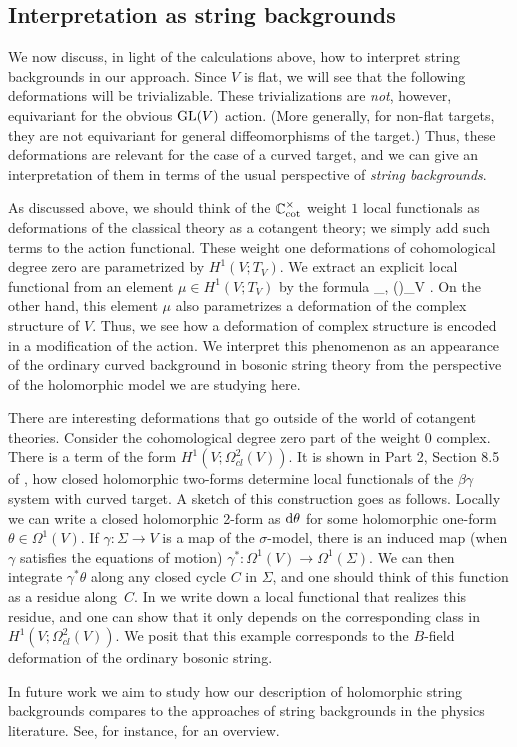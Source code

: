 \subsection{Interpretation as string backgrounds}

We now discuss, in light of the calculations above, how to interpret string backgrounds in our approach. 
Since $V$ is flat,
we will see that the following deformations will be trivializable. 
These trivializations are {\em not}, however, equivariant for the obvious ${\rm GL}(V)$ action.
(More generally, for non-flat targets, they are not equivariant for general diffeomorphisms of the target.) 
Thus, these deformations are relevant for the case of a curved target, and we can give an interpretation of them in terms of the usual perspective of {\em string backgrounds}. 

As discussed above, we should think of the $\mathbb C^\times_{\rm cot}$ weight $1$ local functionals as deformations of the classical theory as a cotangent theory;
we simply add such terms to the action functional.
These weight one deformations of cohomological degree zero are parametrized by $H^1(V ; T_V)$. 
We extract an explicit local functional from an element $\mu \in H^1(V ; T_V)$
by the formula
\ben
\int_\Sigma \<\beta, \mu(\gamma)\>_V .
\een 
On the other hand, this element $\mu$ also parametrizes a deformation of the complex structure of $V$.
Thus, we see how a deformation of complex structure is encoded in a modification of the action. 
We interpret this phenomenon as an appearance of the ordinary curved background in bosonic string theory from the perspective of the holomorphic model we are studying here.

There are interesting deformations that go outside of the world of cotangent theories. 
Consider the cohomological degree zero part of the weight 0 complex. 
There is a term of the form $H^1(V ; \Omega^2_{cl}(V))$.
It is shown in Part 2, Section 8.5 of \cite{GGW}, 
how closed holomorphic two-forms determine local functionals of the $\beta\gamma$ system with curved target. 
A sketch of this construction goes as follows.
Locally we can write a closed holomorphic 2-form as ${\rm d} \theta$ for some holomorphic one-form $\theta \in \Omega^1(V)$. 
If $\gamma : \Sigma \to V$ is a map of the $\sigma$-model, 
there is an induced map (when $\gamma$ satisfies the equations of motion) $\gamma^* : \Omega^1(V) \to \Omega^1(\Sigma)$. 
We can then integrate $\gamma^* \theta$ along any closed cycle $C$ in $\Sigma$, 
and one should think of this function as a residue along~$C$. 
In \cite{GGW} we write down a local functional that realizes this residue, 
and one can show that it only depends on the corresponding class in $H^1(V ; \Omega^2_{cl}(V))$. 
We posit that this example corresponds to the $B$-field deformation of the ordinary bosonic string. 

In future work we aim to study how our description of holomorphic string backgrounds compares to the approaches of string backgrounds in the physics literature. 
See, for instance, \cite{CFMP} for an overview.


